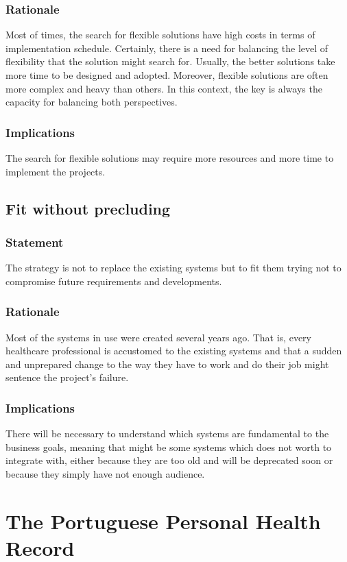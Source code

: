 \subsubsection{Rationale}
Most of times, the search for flexible solutions have high costs in terms of implementation schedule. Certainly, there is a need for balancing the level of flexibility that the solution might search for. Usually, the better solutions take more time to be designed and adopted. Moreover, flexible solutions are often more complex and heavy than others. In this context, the key is always the capacity for balancing both perspectives.
\subsubsection{Implications}
The search for flexible solutions may require more resources and more time to implement the projects.


\subsection{Fit without precluding}

\subsubsection{Statement}
The strategy is not to replace the existing systems but to fit them trying not to compromise future requirements and developments.
\subsubsection{Rationale}
Most of the systems in use were created several years ago. That is, every healthcare professional is accustomed to the existing systems and that a sudden and unprepared change to the way they have to work and do their job might sentence the project's failure.
\subsubsection{Implications}
There will be necessary to understand which systems are fundamental to the business goals, meaning that might be some systems which does not worth to integrate with, either because they are too old and will be deprecated soon or because they simply have not enough audience.






\section{The Portuguese Personal Health Record}

